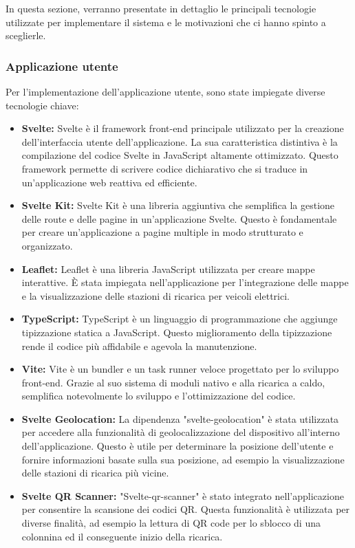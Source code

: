 In questa sezione, verranno presentate in dettaglio le principali tecnologie utilizzate per implementare il sistema e le motivazioni che ci hanno spinto a sceglierle.

\subsubsection{Applicazione utente}

Per l'implementazione dell'applicazione utente, sono state impiegate diverse tecnologie chiave:

\begin{itemize}
      \item \textbf{Svelte:} Svelte è il framework front-end principale utilizzato per la creazione dell'interfaccia utente dell'applicazione. La sua caratteristica distintiva è la compilazione del codice Svelte in JavaScript altamente ottimizzato. Questo framework permette di scrivere codice dichiarativo che si traduce in un'applicazione web reattiva ed efficiente.

      \item \textbf{Svelte Kit:} Svelte Kit è una libreria aggiuntiva che semplifica la gestione delle route e delle pagine in un'applicazione Svelte. Questo è fondamentale per creare un'applicazione a pagine multiple in modo strutturato e organizzato.

      \item \textbf{Leaflet:} Leaflet è una libreria JavaScript utilizzata per creare mappe interattive. È stata impiegata nell'applicazione per l'integrazione delle mappe e la visualizzazione delle stazioni di ricarica per veicoli elettrici.

      \item \textbf{TypeScript:} TypeScript è un linguaggio di programmazione che aggiunge tipizzazione statica a JavaScript. Questo miglioramento della tipizzazione rende il codice più affidabile e agevola la manutenzione.

      \item \textbf{Vite:} Vite è un bundler e un task runner veloce progettato per lo sviluppo front-end. Grazie al suo sistema di moduli nativo e alla ricarica a caldo, semplifica notevolmente lo sviluppo e l'ottimizzazione del codice.

      \item \textbf{Svelte Geolocation:} La dipendenza "svelte-geolocation" è stata utilizzata per accedere alla funzionalità di geolocalizzazione del dispositivo all'interno dell'applicazione. Questo è utile per determinare la posizione dell'utente e fornire informazioni basate sulla sua posizione, ad esempio la visualizzazione delle stazioni di ricarica più vicine.

      \item \textbf{Svelte QR Scanner:} "Svelte-qr-scanner" è stato integrato nell'applicazione per consentire la scansione dei codici QR. Questa funzionalità è utilizzata per diverse finalità, ad esempio la lettura di QR code per lo sblocco di una colonnina ed il conseguente inizio della ricarica.
\end{itemize}

